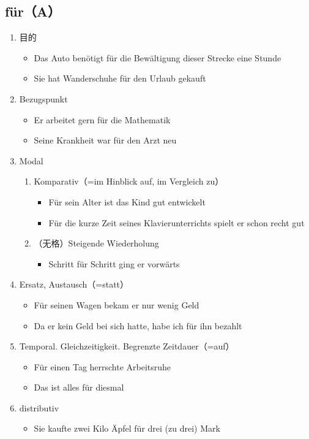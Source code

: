 \documentclass[UTF8]{report}
\begin{document}
\subsection{für（A）}
\begin{enumerate}
    \item 目的
    \begin{itemize}
        \item Das Auto benötigt für die Bewältigung dieser Strecke eine Stunde
        \item Sie hat Wanderschuhe für den Urlaub gekauft
    \end{itemize}
    \item Bezugspunkt
    \begin{itemize}
        \item Er arbeitet gern für die Mathematik
        \item Seine Krankheit war für den Arzt neu
    \end{itemize}
    \item Modal
    \begin{enumerate}
        \item Komparativ（=im Hinblick auf, im Vergleich zu）
        \begin{itemize}
            \item Für sein Alter ist das Kind gut entwickelt
            \item Für die kurze Zeit seines Klavierunterrichts spielt er schon recht gut
        \end{itemize}
        \item （无格）Steigende Wiederholung
        \begin{itemize}
            \item Schritt für Schritt ging er vorwärts
        \end{itemize}
    \end{enumerate}
    \item Ersatz, Austausch（=statt）
    \begin{itemize}
        \item Für seinen Wagen bekam er nur wenig Geld
        \item Da er kein Geld bei sich hatte, habe ich für ihn bezahlt
    \end{itemize}
    \item Temporal. Gleichzeitigkeit. Begrenzte Zeitdauer（=auf）
    \begin{itemize}
        \item Für einen Tag herrschte Arbeitsruhe
        \item Das ist alles für diesmal
    \end{itemize}
    \item distributiv
    \begin{itemize}
        \item Sie kaufte zwei Kilo Äpfel für drei (zu drei) Mark
    \end{itemize}


\end{enumerate}
\end{document}
